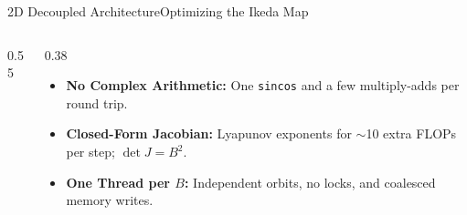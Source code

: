 \documentclass[aspectratio=169]{beamer}
\begin{document}
\begin{frame}{2D Decoupled Architecture}{Optimizing the Ikeda Map}
\begin{columns}[T, onlytextwidth]
\begin{column}{0.55\textwidth}
        \end{column}
        
        \begin{column}{0.38\textwidth}
                    \vspace*{-0.7cm} %

            \begin{itemize}
                \item \textbf{No Complex Arithmetic:} One \texttt{sincos} and a few multiply-adds per round trip.
                
                \item \textbf{Closed-Form Jacobian:} Lyapunov exponents for $\sim$10 extra FLOPs per step; $\det J = B^2$.
                
                \item \textbf{One Thread per $B$:} Independent orbits, no locks, and coalesced memory writes.
            \end{itemize}

        \end{column}
        
    \end{columns}
\end{frame}
\end{document}
